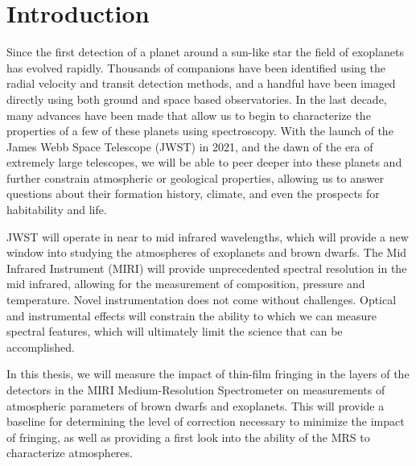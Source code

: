 \newcommand{\bpic}{$\beta$ Pic b }
\newcommand{\mj}{M$_{j}$}
\chapter{Introduction}
Since the first detection of a planet around a sun-like star \parencite{Mayor1995} the field of exoplanets has evolved rapidly.
Thousands of companions have been identified using the radial velocity and transit detection methods, and a handful have been imaged directly using both ground and space based observatories.
In the last decade, many advances have been made that allow us to begin to characterize the properties of a few of these planets using spectroscopy.
With the launch of the James Webb Space Telescope (JWST) in 2021, and the dawn of the era of extremely large telescopes, we will be able to peer deeper into these planets and further constrain atmospheric or geological properties, allowing us to answer questions about their formation history, climate, and even the prospects for habitability and life.

JWST will operate in near to mid infrared wavelengths, which will provide a new window into studying the atmospheres of exoplanets and brown dwarfs. 
The Mid Infrared Instrument (MIRI) will provide unprecedented spectral resolution in the mid infrared, allowing for the measurement of composition, pressure and temperature. 
Novel instrumentation does not come without challenges. 
Optical and instrumental effects will constrain the ability to which we can measure spectral features, which will ultimately limit the science that can be accomplished.

In this thesis, we will measure the impact of thin-film fringing in the layers of the detectors in the MIRI Medium-Resolution Spectrometer on measurements of atmospheric parameters of brown dwarfs and exoplanets.
This will provide a baseline for determining the level of correction necessary to minimize the impact of fringing, as well as providing a first look into the ability of the MRS to characterize atmospheres.

